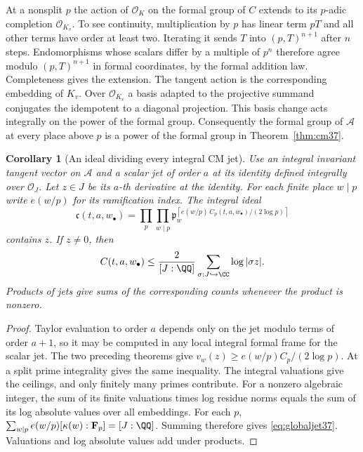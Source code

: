 \documentclass[a4paper,11pt]{article}
\newtheorem{corollary}[proposition]{Corollary}
\theoremstyle{definition}
\theoremstyle{remark}
\numberwithin{equation}{section}
\newcommand{\OO}{\mathcal O}
\begin{document}
At a nonsplit \(p\) the action of \(\OO_K\) on the formal group of \(C\) extends to its \(p\)-adic completion \(\OO_{K_v}\). To see continuity, multiplication by \(p\) has linear term \(pT\) and all other terms have order at least two. Iterating it sends \(T\) into \((p,T)^{n+1}\) after \(n\) steps. Endomorphisms whose scalars differ by a multiple of \(p^n\) therefore agree modulo \((p,T)^{n+1}\) in formal coordinates, by the formal addition law. Completeness gives the extension. The tangent action is the corresponding embedding of \(K_v\). Over \(\OO_{K_v}\) a basis adapted to the projective summand conjugates the idempotent to a diagonal projection. This basis change acts integrally on the power of the formal group. Consequently the formal group of \(\mathcal A\) at every place above \(p\) is a power of the formal group in Theorem~\ref{thm:cm37}.

\begin{corollary}[An ideal dividing every integral CM jet]\label{cor:ideal37}
Use an integral invariant tangent vector on \(\mathcal A\) and a scalar jet of order \(a\) at its identity defined integrally over \(\OO_J\). Let \(z\in J\) be its \(a\)-th derivative at the identity. For each finite place \(w\mid p\) write \(e(w/p)\) for its ramification index. The integral ideal
\[
 \mathfrak c(t,a,w_{\bullet})=
 \prod_{p}\prod_{w\mid p}\mathfrak p_w^{
           \left\lceil e(w/p)\,C_p(t,a,w_{\bullet})/(2\log p)\right\rceil}
\]
contains \(z\). If \(z\ne0\), then
\begin{equation}
            C(t,a,w_{\bullet})\le
      \frac{2}{[J:\QQ]}\sum_{\sigma:J\hookrightarrow\CC}\log|\sigma z|.
                                                               \label{eq:globaljet37}
\end{equation}
Products of jets give sums of the corresponding counts whenever the product is nonzero.
\end{corollary}
\begin{proof}
Taylor evaluation to order \(a\) depends only on the jet modulo terms of order \(a+1\), so it may be computed in any local integral formal frame for the scalar jet. The two preceding theorems give \(v_w(z)\ge e(w/p)C_p/(2\log p)\). At a split prime integrality gives the same inequality. The integral valuations give the ceilings, and only finitely many primes contribute. For a nonzero algebraic integer, the sum of its finite valuations times log residue norms equals the sum of its log absolute values over all embeddings. For each \(p\), \(\sum_{w\mid p} e(w/p)[\kappa(w):\mathbf F_p]=[J:\QQ]\). Summing therefore gives \eqref{eq:globaljet37}. Valuations and log absolute values add under products.
\end{proof}
\end{document}
